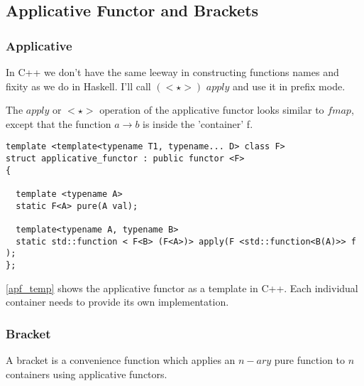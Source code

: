 \documentclass[12pt,fleqn]{article}
\begin{document}
%
%
\subsection{Applicative Functor and Brackets}
%
%
%
\subsubsection{Applicative}
%
%
In C++ we don't have the same leeway in  constructing functions names and fixity as we do in Haskell.
I'll call $(<\star>)$ $apply$ and use it in prefix mode.

The $apply$ or $<\star>$ operation of the applicative functor looks similar to $fmap$, except that the function $a \rightarrow b$ is inside the 'container' f.


%
%
%
\begin{minipage}{\linewidth}
\begin{lstlisting}[caption=applicative functor template in C++, label=apf_temp]
template <template<typename T1, typename... D> class F> 
struct applicative_functor : public functor <F>
{

  template <typename A> 
  static F<A> pure(A val);

  template<typename A, typename B>
  static std::function < F<B> (F<A>)> apply(F <std::function<B(A)>> f );
};
\end{lstlisting}
\end{minipage}
%
%
%

\ref{apf_temp} shows the applicative functor as a template in C++. 
Each individual container needs to provide its own implementation. 
%
%
%

%
%
%
\subsubsection{Bracket}
%
%

A bracket is a convenience function which applies an $n-ary$ pure function to $n$ containers using applicative functors.
\end{document}
